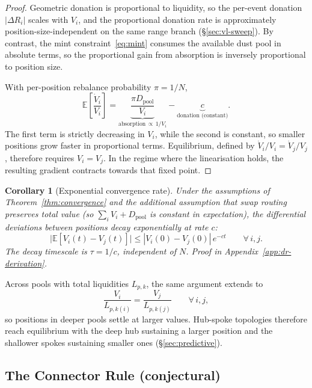 \documentclass[11pt,a4paper]{article}
\theoremstyle{plain}
\newtheorem{corollary}{Corollary}[theorem]
\begin{document}
\begin{proof}
Geometric donation is proportional to liquidity, so the per-event donation $|\Delta R_i|$ scales with $V_i$, and the proportional donation rate is approximately position-size-independent on the same range branch (\S\ref{sec:vl-sweep}). By contrast, the mint constraint~\eqref{eq:mint} consumes the available dust pool in absolute terms, so the proportional gain from absorption is inversely proportional to position size.

With per-position rebalance probability $\pi = 1/N$,
\begin{equation}\label{eq:growth}
\mathbb{E}\!\left[\frac{\dot{V}_i}{V_i}\right]
=
\underbrace{\frac{\pi D_{\text{pool}}}{V_i}}_{\text{absorption}\,\propto\,1/V_i}
-
\underbrace{c}_{\text{donation (constant)}}.
\end{equation}
The first term is strictly decreasing in $V_i$, while the second is constant, so smaller positions grow faster in proportional terms. Equilibrium, defined by $\dot{V}_i/V_i = \dot{V}_j/V_j$, therefore requires $V_i = V_j$. In the regime where the linearisation holds, the resulting gradient contracts towards that fixed point.
\end{proof}

\begin{corollary}[Exponential convergence rate]\label{cor:convergence-rate}
Under the assumptions of Theorem~\ref{thm:convergence} and the additional assumption that swap routing preserves total value (so $\sum_i V_i + D_{\text{pool}}$ is constant in expectation), the differential deviations between positions decay exponentially at rate $c$:
\[
\bigl|\mathbb{E}[V_i(t) - V_j(t)]\bigr|
\leq
|V_i(0) - V_j(0)|\,e^{-ct}
\qquad \forall\, i,j.
\]
The decay timescale is $\tau = 1/c$, independent of $N$. Proof in Appendix~\ref{app:dr-derivation}.
\end{corollary}

\noindent Across pools with total liquidities $L_{p,k}$, the same argument extends to
\begin{equation}\label{eq:multipool}
\frac{V_i}{L_{p,k(i)}}
=
\frac{V_j}{L_{p,k(j)}}
\qquad \forall\, i,j,
\end{equation}
so positions in deeper pools settle at larger values. Hub-spoke topologies therefore reach equilibrium with the deep hub sustaining a larger position and the shallower spokes sustaining smaller ones (\S\ref{sec:predictive}).

\subsection{The Connector Rule (conjectural)}\label{sec:connector}
\end{document}
